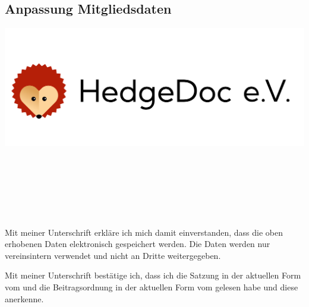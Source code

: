\documentclass[paper=a4,twoside=false,DIV=15,fontsize=11pt,parskip=half]{scrartcl}
\begin{document}
\begin{Form}

\begin{minipage}[h]{0.5\textwidth}
  \section*{\huge Anpassung Mitgliedsdaten}
\end{minipage}
\begin{minipage}[h]{0.5\textwidth}
  \hfill
  \includegraphics[width=0.3\paperwidth]{./hedgedoc-ev.pdf}
\end{minipage}

\\[0.5em]
\hfill {}\hfill {}\\[2mm]
\\[-\baselineskip]

\\[2mm]
\\[2mm]
\hfill {}\\[-\baselineskip]

Mit meiner Unterschrift erkläre ich mich damit einverstanden, dass die oben erhobenen Daten elektronisch gespeichert werden.
Die Daten werden nur vereinsintern verwendet und nicht an Dritte weitergegeben.

Mit meiner Unterschrift bestätige ich, dass ich die Satzung in der aktuellen Form vom \datumsatzung und die Beitragsordnung in der aktuellen Form vom \datumbeitrago gelesen habe und diese anerkenne.\\

\vspace{1cm}

 \hfill {}\\

\end{Form}
\end{document}
